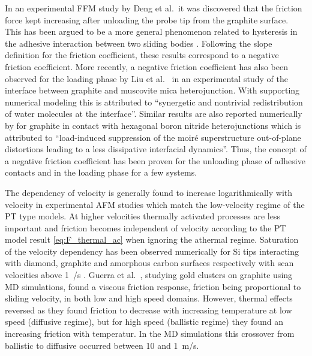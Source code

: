In an experimental \acrshort{FFM} study by Deng et al.\ it was discovered that
the friction force kept increasing after unloading the probe tip from the
graphite surface. This has been argued to be a more general phenomenon
related to hysteresis in the adhesive interaction between two sliding bodies
\cite{thormann_negative_2013}. Following the slope definition for the friction
coefficient, these results correspond to a negative friction coefficient. More recently, a negative friction coefficient has also been observed for the loading phase by Liu et al.\ \cite{Liu_2020} in an experimental study of the interface between graphite and muscovite mica heterojunction. With supporting numerical modeling this is attributed to ``synergetic and nontrivial redistribution of water molecules at the interface''. Similar results are also reported numerically by \cite{Mandelli_2019} for graphite in contact with hexagonal boron nitride heterojunctions which is attributed to ``load-induced suppression of the moiré superstructure out-of-plane distortions leading to a less dissipative interfacial dynamics''. Thus, the concept of a negative friction coefficient has been proven for the unloading phase of adhesive contacts and in the loading phase for a few systems. 

The dependency of velocity is generally found to increase logarithmically with
velocity in experimental \acrshort{AFM} studies \cite[p. 201]{gnecco_meyer_2015}
which match the low-velocity regime of the \acrshort{PT} type models. At higher
velocities thermally activated processes are less important and friction becomes
independent of velocity according to the \acrshort{PT} model result \cref{eq:F_thermal_ac} when ignoring the athermal regime. Saturation of the velocity dependency has been observed numerically for Si tips interacting with diamond, graphite and amorphous carbon surfaces respectively with scan velocities above \SI{1}{\mu/s} \cite{zworner1998velocity}.  Guerra et al.\ \cite{Guerra_2010}, studying gold clusters on graphite using \acrshort{MD} simulations, found a viscous friction response, friction being proportional to sliding velocity, in both low and high speed domains. However, thermal effects reversed as they found friction to decrease with increasing temperature at low speed (diffusive regime), but for high speed (ballistic regime) they found an increasing friction with temperatur. In the \acrshort{MD} simulations this crossover from ballistic to diffusive occurred between 10 and \SI{1}{m/s}. 


